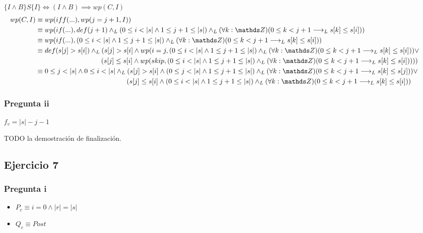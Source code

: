 $ \{ I \wedge B \} S \{ I \} \iff (I \wedge B) \implies wp(C, I) $
\begin{align*}
    wp(C, I) &\equiv wp(iff(...), wp(j=j+1, I)) \\
    &\equiv wp(if(...), def(j+1) \yLuego (0 \leq i < |s| \wedge 1 \leq j+1 \leq |s|) \yLuego (\forall k: \ent)(0 \leq k < j+1 \implicaLuego s[k] \leq s[i])) \\
    &\equiv wp(if(...), (0 \leq i < |s| \wedge 1 \leq j+1 \leq |s|) \yLuego (\forall k: \ent)(0 \leq k < j+1 \implicaLuego s[k] \leq s[i])) \\
    &\equiv def(s[j] > s[i]) \yLuego (s[j] > s[i] \wedge wp(i = j, (0 \leq i < |s| \wedge 1 \leq j+1 \leq |s|) \yLuego (\forall k: \ent)(0 \leq k < j+1 \implicaLuego s[k] \leq s[i])) \vee \\
    &\qquad \qquad \qquad \qquad \quad \; \; (s[j] \leq s[i] \wedge wp(skip, (0 \leq i < |s| \wedge 1 \leq j+1 \leq |s|) \yLuego (\forall k: \ent)(0 \leq k < j+1 \implicaLuego s[k] \leq s[i])))) \\
    &\equiv 0 \leq j < |s| \wedge 0 \leq i < |s| \yLuego (s[j] > s[i] \wedge (0 \leq j < |s| \wedge 1 \leq j+1 \leq |s|) \yLuego (\forall k: \ent)(0 \leq k < j+1 \implicaLuego s[k] \leq s[j])) \vee \\
    &\qquad \qquad \qquad \qquad \qquad \qquad \quad \; (s[j] \leq s[i] \wedge (0 \leq i < |s| \wedge 1 \leq j+1 \leq |s|) \yLuego (\forall k: \ent)(0 \leq k < j+1 \implicaLuego s[k] \leq s[i])) \\
\end{align*}

\subsubsection{Pregunta ii}

$ f_v = |s| - j -1 $

TODO la demostración de finalización.

\subsection{Ejercicio 7}

\subsubsection{Pregunta i}

\begin{itemize}
    \item $ P_c \equiv i = 0 \wedge |r| = |s| $
    \item $ Q_c \equiv Post $
\end{itemize}

